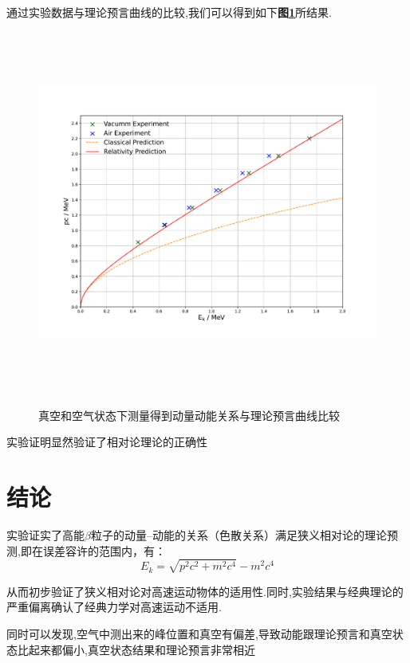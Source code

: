 \documentclass[a4paper]{article}
\begin{document}
通过实验数据与理论预言曲线的比较,我们可以得到如下\textbf{图\ref{fig:fig6}}所结果. 
\begin{figure}[H]
 \centering
 \caption{真空和空气状态下测量得到动量动能关系与理论预言曲线比较}
 \includegraphics[height=12cm, width=16cm]{images/phyex4_fig.pdf}
 \label{fig:fig6}
\end{figure}
实验证明显然验证了相对论理论的正确性


\newpage
\section{结论}\label{conclusions}
实验证实了高能$\beta$粒子的动量--动能的关系（色散关系）满足狭义相对论的理论预测,即在误差容许的范围内，有：
\begin{equation}
	E_k = \sqrt{p^2 c^2 + m^2 c^4} - m^2 c^4
\end{equation}
	
从而初步验证了狭义相对论对高速运动物体的适用性.同时,实验结果与经典理论的严重偏离确认了经典力学对高速运动不适用.

同时可以发现,空气中测出来的峰位置和真空有偏差,导致动能跟理论预言和真空状态比起来都偏小,真空状态结果和理论预言非常相近
\end{document}
